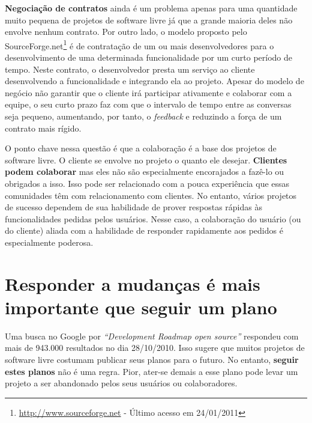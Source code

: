 \textbf{Negociação de contratos} ainda é um problema apenas para uma
quantidade muito pequena de projetos de software livre já que a grande
maioria deles não envolve nenhum contrato.  Por outro lado, o modelo
proposto pelo
SourceForge.net\footnote{\url{http://www.sourceforge.net} - Último
  acesso em 24/01/2011} é de contratação de um ou mais desenvolvedores
para o desenvolvimento de uma determinada funcionalidade por um curto
período de tempo. Neste contrato, o desenvolvedor presta um serviço ao
cliente desenvolvendo a funcionalidade e integrando ela ao
projeto. Apesar do modelo de negócio não garantir que o cliente irá
participar ativamente e colaborar com a equipe, o seu curto prazo faz
com que o intervalo de tempo entre as conversas seja pequeno,
aumentando, por tanto, o \emph{feedback} e reduzindo a força de um
contrato mais rígido.

O ponto chave nessa questão é que a colaboração é a base dos projetos
de software livre.  O cliente se envolve no projeto o quanto ele
desejar. \textbf{Clientes podem colaborar} mas eles não são
especialmente encorajados a fazê-lo ou obrigados a isso. Isso pode ser
relacionado com a pouca experiência que essas comunidades têm com
relacionamento com clientes. No entanto, vários projetos de sucesso
dependem de sua habilidade de prover respostas rápidas às
funcionalidades pedidas pelos usuários. Nesse caso, a colaboração do
usuário (ou do cliente) aliada com a habilidade de responder
rapidamente aos pedidos é especialmente poderosa.

\section{Responder a mudanças é mais importante que seguir um plano}
\label{sec:fourth-princ}

Uma busca no Google por \emph{``Development Roadmap open source''}
respondeu com mais de 943.000 resultados no dia 28/10/2010. Isso
sugere que muitos projetos de software livre costumam publicar seus
planos para o futuro. No entanto, \textbf{seguir estes planos} não é
uma regra. Pior, ater-se demais a esse plano pode levar um projeto a
ser abandonado pelos seus usuários ou colaboradores.

